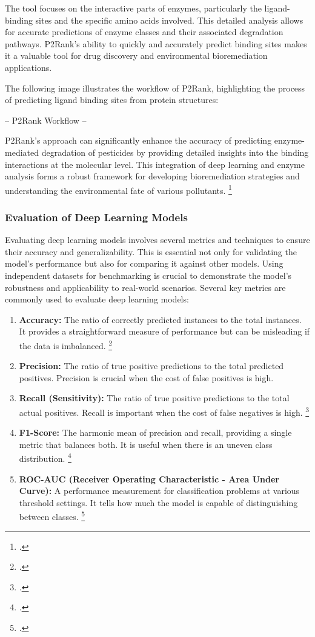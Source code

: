 The tool focuses on the interactive parts of enzymes, particularly the ligand-binding sites and the specific amino acids involved. This detailed analysis allows for accurate predictions of enzyme classes and their associated degradation pathways. P2Rank's ability to quickly and accurately predict binding sites makes it a valuable tool for drug discovery and environmental bioremediation applications.

The following image illustrates the workflow of P2Rank, highlighting the process of predicting ligand binding sites from protein structures:

-- P2Rank Workflow --

P2Rank's approach can significantly enhance the accuracy of predicting enzyme-mediated degradation of pesticides by providing detailed insights into the binding interactions at the molecular level. This integration of deep learning and enzyme analysis forms a robust framework for developing bioremediation strategies and understanding the environmental fate of various pollutants. \footcite{krivakP2RankMachineLearning2018}

\subsubsection{Evaluation of Deep Learning Models}
\label{sec:Evaluation of Deep Learning Models}

Evaluating deep learning models involves several metrics and techniques to ensure their accuracy and generalizability. This is essential not only for validating the model’s performance but also for comparing it against other models. Using independent datasets for benchmarking is crucial to demonstrate the model's robustness and applicability to real-world scenarios. Several key metrics are commonly used to evaluate deep learning models:

\begin{enumerate}
    \item \textbf{Accuracy:} The ratio of correctly predicted instances to the total instances. It provides a straightforward measure of performance but can be misleading if the data is imbalanced. \footcite{AccuracyPrecision2024}
    \item \textbf{Precision:} The ratio of true positive predictions to the total predicted positives. Precision is crucial when the cost of false positives is high.
    \item \textbf{Recall (Sensitivity):} The ratio of true positive predictions to the total actual positives. Recall is important when the cost of false negatives is high. \footcite{PrecisionRecall2024}
    \item \textbf{F1-Score:} The harmonic mean of precision and recall, providing a single metric that balances both. It is useful when there is an uneven class distribution. \footcite{Fscore2024}
    \item \textbf{ROC-AUC (Receiver Operating Characteristic - Area Under Curve):} A performance measurement for classification problems at various threshold settings. It tells how much the model is capable of distinguishing between classes. \footcite{ReceiverOperatingCharacteristic2024}
\end{enumerate}

